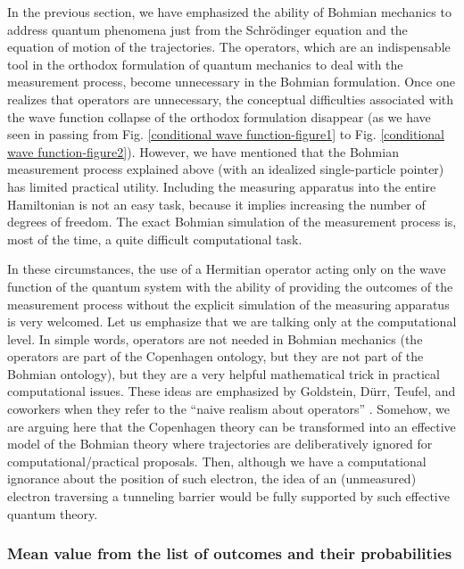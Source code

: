 \documentclass[nofootinbib, secnumarabic, amsmath, nobibnotes,10pt,aps,pra]{revtex4-1}
\newcommand{\fref}[1]{Fig. \ref{#1}}
\begin{document}
In the previous section, we have emphasized the ability of Bohmian
mechanics to address quantum phenomena just from the
Schr\"odinger equation and the equation of motion of the
trajectories. The operators, which are an indispensable tool in the
orthodox formulation of quantum mechanics to deal with  the measurement
process, become unnecessary in the Bohmian formulation. Once one
realizes that operators are unnecessary, the conceptual difficulties
associated with the wave function collapse of the orthodox
formulation disappear (as we have seen in passing from \fref{conditional wave function-figure1} to \fref{conditional wave function-figure2}). However, we have mentioned that the Bohmian measurement process explained above (with an idealized single-particle pointer) has limited practical utility. Including the measuring apparatus into the entire
Hamiltonian is not an easy task, because it implies increasing the
number of degrees of freedom. The exact Bohmian simulation of the measurement
process is, most of the time, a quite difficult computational task.

In these circumstances, the use of a Hermitian operator acting only
on the wave function of the quantum system with the ability of
providing the outcomes of the measurement process without the
explicit simulation of the measuring apparatus is very welcomed. Let
us emphasize that we are talking only at the computational level. In
simple words, operators are not needed in Bohmian mechanics (the operators are part of the Copenhagen ontology, but they are not part of the Bohmian ontology), but
they are a very helpful mathematical trick in practical
computational issues. These ideas are emphasized by Goldstein,
D\"{u}rr, Teufel, and coworkers when they refer to the ``naive
realism about operators'' \cite{om.Durrnaive,om.Durrllibre,om.goldstein}. Somehow, we are arguing here that the Copenhagen theory can be transformed into an effective model of the Bohmian theory where trajectories are deliberatively ignored  for computational/practical  proposals. Then, although we have a computational ignorance about the position of such electron, the idea of an (unmeasured) electron traversing a tunneling barrier would be fully supported by such effective quantum theory.  


\subsubsection{Mean value from the list of outcomes and their probabilities}
\end{document}
